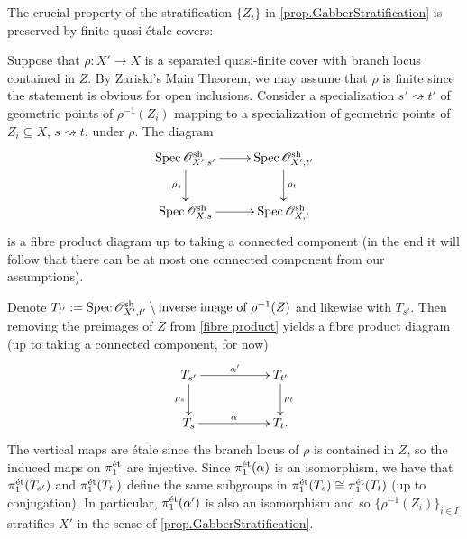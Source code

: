 \documentclass[12pt]{amsart}
\numberwithin{equation}{theorem}
\renewcommand{\:}{\colon}
\newcommand{\piet}{\pi_1^{\textnormal{\'{e}t}}} %
\theoremstyle{theorem}
\def\todo#1{\textcolor{Mahogany}%
{\footnotesize\newline{\color{Mahogany}\fbox{\parbox{\textwidth-15pt}{\textbf{todo:
} #1}}}\newline}}
\renewcommand{\O}{\mathscr O}
\begin{document}
\begin{remark} \label{rem.StratificationBehavesWellUnderPullback}
The crucial property of the stratification $\{ Z_i \}$ in \autoref{prop.GabberStratification} is preserved by finite quasi-\'etale covers:

Suppose that $\rho\colon X' \to X$ is a separated quasi-finite cover with branch locus contained in $Z$.
By Zariski's Main Theorem, we may assume that $\rho$ is finite since the statement is obvious for open inclusions.
Consider a specialization $s' \rightsquigarrow t'$ of geometric points of $\rho^{-1}(Z_i)$ mapping to a specialization of geometric points of $Z_i \subseteq X$, $s \rightsquigarrow t$, under $\rho$.
The diagram
\begin{equation} \label{fibre product}
\xymatrix{
\Spec \O_{X',s'}^{\sh} \ar[r] \ar[d]_-{\rho_s} & \Spec \O_{X',t'}^{\sh} \ar[d]^-{\rho_t} \\
\Spec \O_{X,s}^{\sh} \ar[r] & \Spec \O_{X,t}^{\sh}
}
\end{equation}
is a fibre product diagram up to taking a connected component (in the end it will follow that there can be at most one connected component from our assumptions).

Denote $T_{t'} := \Spec \O_{X', t'}^{\sh} \setminus \text{inverse image of $\rho^{-1}(Z)$}$ and likewise with $T_{s'}$.
Then removing the preimages of $Z$ from \eqref{fibre product} yields a fibre product diagram (up to taking a connected component, for now)
\[ \xymatrix{
T_{s'} \ar[rr]^-{\alpha'} \ar[d]_-{\rho_s} & & T_{t'} \ar[d]^-{\rho_t} \\
T_s \ar[rr]^-\alpha & & T_t.
} \]
The vertical maps are \'etale since the branch locus of $\rho$ is contained in $Z$, so the induced maps on $\pi_1^{\textnormal{{\'e}t}}$ are injective.
Since $\piet(\alpha)$ is an isomorphism, we have that $\piet(T_{s'})$ and $\piet(T_{t'})$ define the same subgroups in $\piet(T_s) \cong \piet(T_t)$ (up to conjugation).
In particular, $\piet(\alpha')$ is also an isomorphism and so $\{ \rho^{-1}(Z_i) \}_{i \in I}$ stratifies $X'$ in the sense of \autoref{prop.GabberStratification}.
%
\end{remark}
\end{document}
